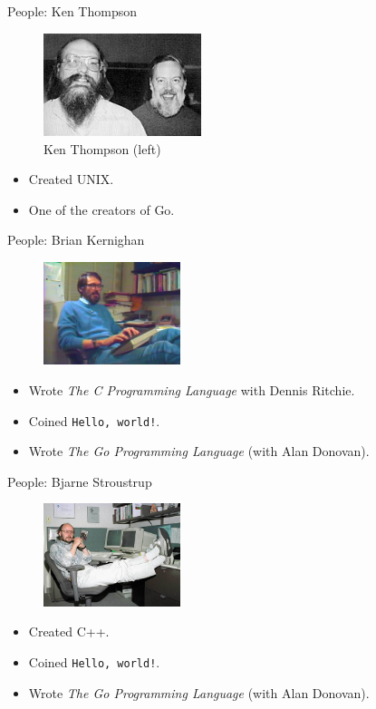 \begin{frame}{People: Ken Thompson}
  \begin{figure}
    \includegraphics[height=3cm]{img/ritchie-thompson.jpg}
    \caption*{Ken Thompson (left)}
  \end{figure}
  \begin{itemize}
    \item Created UNIX.
    \item One of the creators of Go.
  \end{itemize}
\end{frame}


\begin{frame}{People: Brian Kernighan}
  \begin{figure}
    \includegraphics[height=3cm]{img/brian-kernighan.jpg}
  \end{figure}
  \begin{itemize}
    \item Wrote \emph{The C Programming Language} with Dennis Ritchie.
    \item Coined \texttt{Hello, world!}.
    \item Wrote \emph{The Go Programming Language} (with Alan Donovan).
  \end{itemize}
\end{frame}

\begin{frame}{People: Bjarne Stroustrup}
  \begin{figure}
    \includegraphics[height=3cm]{img/bjarne-stroustrup.jpg}
  \end{figure}
  \begin{itemize}
    \item Created C++.
    \item Coined \texttt{Hello, world!}.
    \item Wrote \emph{The Go Programming Language} (with Alan Donovan).
  \end{itemize}
\end{frame}

